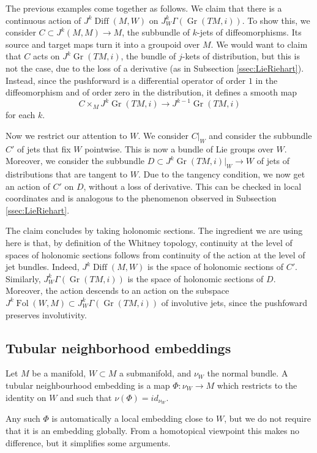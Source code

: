 \documentclass[10pt]{amsart}
\newcommand{\Gr}{\operatorname{Gr}}
\newcommand{\Diff}{{\operatorname{Diff}}}
\newcommand{\FolObj}{{\operatorname{Fol}}}
\numberwithin{theoremalpha}{section}
\numberwithin{equation}{section}
\numberwithin{definition}{section}
\numberwithin{theorem}{section}
\numberwithin{proposition}{section}
\numberwithin{lemma}{section}
\numberwithin{example}{section}
\numberwithin{remark}{section}
\numberwithin{corollary}{section}
\numberwithin{question}{section}
\numberwithin{problem}{section}
\numberwithin{assumption}{section}
\theoremstyle{named}
\numberwithin{equation}{section}
\begin{document}
\begin{example} \label{ex:grass3}
The previous examples come together as follows. We claim that there is a continuous action of $J^k\Diff(M,W)$ on $J^k_W\Gamma(\Gr(TM,i))$. To show this, we consider $C \subset J^k(M,M) \rightarrow M$, the subbundle of $k$-jets of diffeomorphisms. Its source and target maps turn it into a groupoid over $M$. We would want to claim that $C$ acts on $J^k\Gr(TM,i)$, the bundle of $j$-kets of distribution, but this is not the case, due to the loss of a derivative (as in Subsection \ref{ssec:LieRiehart}). Instead, since the pushforward is a differential operator of order $1$ in the diffeomorphism and of order zero in the distribution, it defines a smooth map
\[ C \times_M J^k\Gr(TM,i) \rightarrow J^{k-1}\Gr(TM,i) \]
for each $k$.

Now we restrict our attention to $W$. We consider $C|_W$ and consider the subbundle $C'$ of jets that fix $W$ pointwise. This is now a bundle of Lie groups over $W$. Moreover, we consider the subbundle $D \subset J^k\Gr(TM,i)|_W \rightarrow W$ of jets of distributions that are tangent to $W$. Due to the tangency condition, we now get an action of $C'$ on $D$, without a loss of derivative. This can be checked in local coordinates and is analogous to the phenomenon observed in Subsection \ref{ssec:LieRiehart}.

The claim concludes by taking holonomic sections. The ingredient we are using here is that, by definition of the Whitney topology, continuity at the level of spaces of holonomic sections follows from continuity of the action at the level of jet bundles. Indeed, $J^k\Diff(M,W)$ is the space of holonomic sections of $C'$. Similarly, $J^k_W\Gamma(\Gr(TM,i))$ is the space of holonomic sections of $D$. Moreover, the action descends to an action on the subspace $J^{k}\FolObj(W,M) \subset J^k_W\Gamma(\Gr(TM,i))$ of involutive jets, since the pushfoward preserves involutivity.
\end{example}




\subsection{Tubular neighborhood embeddings} \label{ssec:TNE}
Let $M$ be a manifold, $W \subset M$ a submanifold, and $\nu_{W}$ the normal bundle. A tubular neighbourhood embedding is a map $\Phi : \nu_{W} \to M$ which restricts to the identity on $W$ and such that $\nu(\Phi) = id_{\nu_{W}}$. 
\begin{remark}
Any such $\Phi$ is automatically a local embedding close to $W$, but we do not require that it is an embedding globally. From a homotopical viewpoint this makes no difference, but it simplifies some arguments.
\end{remark}
\end{document}
